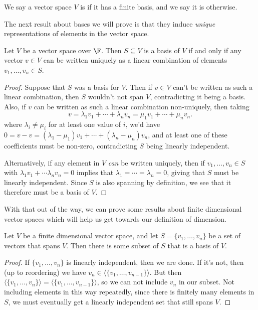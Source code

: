 \documentclass[a4paper]{scrartcl}
\begin{document}
\begin{definition}
    We say a vector space $V$ is  if it has a finite basis, and we say it is  otherwise.
\end{definition}

The next result about bases we will prove is that they induce \emph{unique} representations of elements in the vector space.

\begin{lemma}
    Let $V$ be a vector space over $\F$. Then $S \subseteq V$ is a basis of $V$ if and only if any vector $v \in V$ can be written uniquely as a linear combination of elements $v_1, \dots, v_n \in S$.
\end{lemma}
\begin{proof}
    Suppose that $S$ was a basis for $V$.
    Then if $v \in V$ can't be written as such a linear combination, then $S$ wouldn't not span $V$, contradicting it being a basis.
    Also, if $v$ can be written as such a linear combination non-uniquely, then taking
    $$
v = \lambda_1 v_1 + \cdots + \lambda_n v_n = \mu_1 v_1 + \cdots + \mu_n v_n.
    $$
    where $\lambda_i \neq \mu_i$ for at least one value of $i$, we'd have
    $0 = v - v = (\lambda_1 - \mu_1) v_1 + \cdots + (\lambda_n - \mu_n)v_n$,
    and at least one of these coefficients must be non-zero, contradicting $S$ being linearly independent.

    Alternatively, if any element in $V$ \emph{can} be written uniquely, then if $v_1, \dots, v_n \in S$ with $\lambda_1 v_1 + \cdots \lambda_n v_n = 0$ implies that $\lambda_1 = \cdots = \lambda_n = 0$, giving that $S$ must be linearly independent. Since $S$ is also spanning by definition, we see that it therefore must be a basis of $V$.
\end{proof}

With that out of the way, we can prove some results about finite dimensional vector spaces which will help us get towards our definition of dimension. 

\begin{lemma}
    Let $V$ be a finite dimensional vector space, and let $S = \{v_1, \dots, v_n\}$ be a set of vectors that spans $V$. Then there is some subset of $S$ that is a basis of $V$.
\end{lemma}
\begin{proof}
    If $\{v_1, \dots, v_n\}$ is linearly independent, then we are done. If it's not, then (up to reordering) we have $v_n \in \langle\{v_1, \dots, v_{n - 1}\}\rangle$. But then $\langle\{v_1, \dots, v_n\}\rangle = \langle\{v_1, \dots, v_{n - 1}\}\rangle$, so we can not include $v_n$ in our subset. Not including elements in this way repeatedly, since there is finitely many elements in $S$, we must eventually get a linearly independent set that still spans $V$.
\end{proof}
\end{document}
